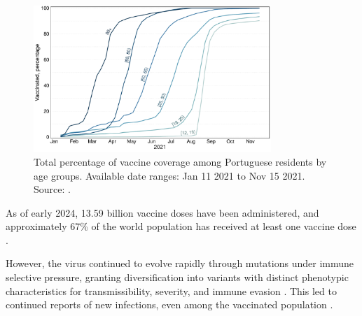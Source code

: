 \begin{figure}[h]
    \centering
    \includegraphics[width=0.8\textwidth]{chapter/introduction/figures/2021-vaccination-percent-agegroup.pdf}
    \caption[Total percentage of vaccine coverage among Portuguese residents by age groups]{Total percentage of vaccine coverage among Portuguese residents by age groups. Available date ranges: Jan 11 2021 to Nov 15 2021. Source: \citet{nationaldirectorateofhealth2021COVID19Vaccination}.}
    \label{fig:intro-vaccination-percentages}
\end{figure}

As of early 2024, 13.59 billion \covid vaccine doses have been administered, and approximately 67\% of the world population has received at least one \covid vaccine dose \citep{worldhealthorganization2023WHOCoronavirus}.

However, the virus continued to evolve rapidly through mutations under immune selective pressure, granting diversification into variants with distinct phenotypic characteristics for transmissibility, severity, and immune evasion \citep{markov2023EvolutionSARSCoV2}.
This led to continued reports of new infections, even among the vaccinated population \citep{willyard2023AreRepeat}.




